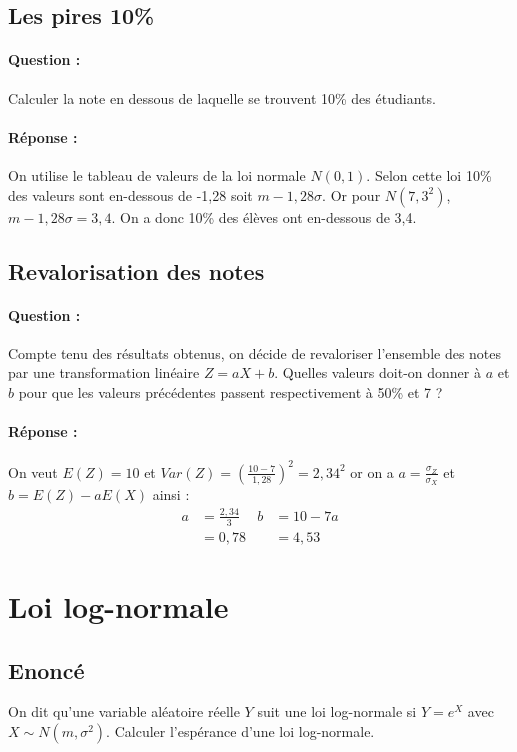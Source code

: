 \documentclass[10pt,a4paper,twoside]{article}
\begin{document}
\subsection{Les pires 10\%}
\paragraph{Question :} Calculer la note en dessous de laquelle se trouvent 10\% des étudiants.

\paragraph{Réponse :} On utilise le tableau de valeurs de la loi normale $N(0,1)$. Selon cette loi 10\% des valeurs sont en-dessous de -1,28 soit $m-1,28\sigma$. Or pour $N(7,3^{2})$, $m-1,28\sigma=3,4$. On a donc 10\% des élèves ont en-dessous de 3,4.

\subsection{Revalorisation des notes}
\paragraph{Question :} Compte tenu des résultats obtenus, on décide de revaloriser l'ensemble des notes par une transformation linéaire $Z=aX+b$. Quelles valeurs doit-on donner à $a$ et $b$ pour que les valeurs précédentes passent respectivement à 50\% et 7 ?

\paragraph{Réponse :} On veut $E(Z)=10$ et $Var(Z) = (\frac{10-7}{1,28})^{2} = 2,34^{2}$ or on a $a=\frac{\sigma_{Z}}{\sigma_{X}}$ et $b=E(Z)-aE(X)$ ainsi :
\begin{align*}
a&=\frac{2,34}{3} &  b&=10-7a\\
&=0,78 & &=4,53
\end{align*}

\section{Loi log-normale}
\subsection*{Enoncé}
On dit qu'une variable aléatoire réelle $Y$ suit une loi log-normale si $Y=e^{X}$ avec $X\sim N(m,\sigma^{2})$. Calculer l'espérance d'une loi log-normale.
\end{document}
